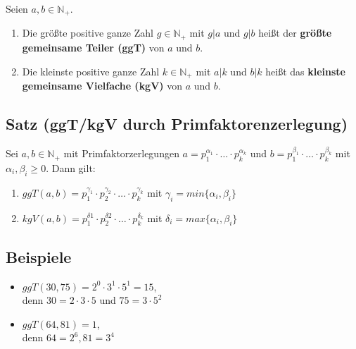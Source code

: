 	Seien $a,b \in \mathbb{N_+}$.
	
	\begin{enumerate}
	
	\item Die größte positive ganze Zahl $g \in \mathbb{N_+}$ mit $g|a$ und $g|b$ heißt der 
	\textbf{größte gemeinsame Teiler (ggT)} von $a$ und $b$.
		
	\item Die kleinste positive ganze Zahl $k \in \mathbb{N_+}$ mit $a|k$ und $b|k$ heißt das 
	\textbf{kleinste gemeinsame Vielfache (kgV)} von $a$ und $b$.
		
	\end{enumerate}


\subsection[ggT/kgV durch Primfaktorenzerlegung]{Satz (ggT/kgV durch Primfaktorenzerlegung)}

	Sei $a,b \in \mathbb{N_+}$ mit Primfaktorzerlegungen $a=p_1^{\alpha_1} \cdot \ldots \cdot p_k^{\alpha_k}$ und
	$b=p_1^{\beta_1} \cdot \ldots \cdot p_k^{\beta_k}$ mit $\alpha_i, \beta_i \geq 0$.
	Dann gilt:
	\begin{enumerate}
		
	\item $ggT(a,b)=p_1^{\gamma_1}\cdot p_2^{\gamma_2} \cdot \ldots \cdot p_k^{\gamma_k}$ 
	mit $\gamma_i=min\{\alpha_i,\beta_i \}$
		
	\item $kgV(a,b)=p_1^{\delta1}\cdot p_2^{\delta2} \cdot \ldots \cdot p_k^{\delta_k}$ 
	mit $\delta_i=max\{\alpha_i,\beta_i \}$
		
	\end{enumerate}
	
		
\subsection{Beispiele}

	\begin{itemize}
			
	\item $ggT(30,75)= 2^0\cdot 3^1\cdot 5^1 = 15$,\\ denn $30=2 \cdot 3 \cdot 5$ und $75=3 \cdot 5^2$
	\item $ggT(64,81)= 1$,\\ denn $64=2^6, 81=3^4$

	\end{itemize}	

